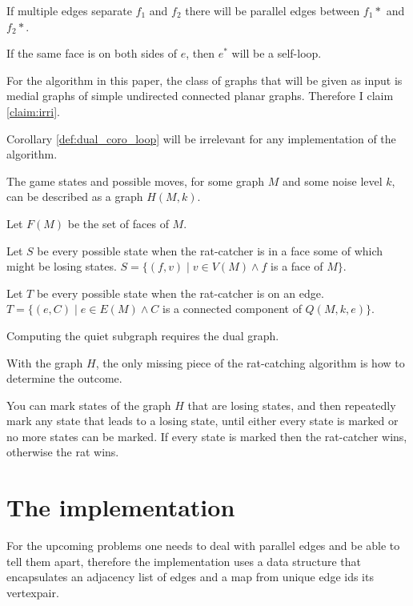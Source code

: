 \documentclass{article}
\begin{document}
	\begin{corollary}
		If multiple edges separate $f_1$ and $f_2$ there will be parallel edges between $f_1*$ and $f_2*$.
	\end{corollary}
	
	\begin{corollary}\label{def:dual_coro_loop}
		If the same face is on both sides of $e$, then $e^*$ will be a self-loop.
	\end{corollary}

	For the algorithm in this paper, the class of graphs that will be given as input is medial graphs of simple undirected connected planar graphs. Therefore I claim \ref{claim:irri}.

	\begin{claim}\label{claim:irri}
		Corollary \ref{def:dual_coro_loop} will be irrelevant for any implementation of the algorithm.
	\end{claim}

	The game states and possible moves, for some graph $M$ and some noise level $k$, can be described as a graph $H(M, k)$.

	Let $F(M)$ be the set of faces of $M$.

	Let $S$ be every possible state when the rat-catcher is in a face some of which might be losing states. $S = \{ (f, v) \mid v \in V(M) \land f$ is a face of $ M \}$.

	Let $T$ be every possible state when the rat-catcher is on an edge. $T = \{ (e, C) \mid e \in E(M) \land C$ is a connected component of $Q(M, k, e) \}$.

	Computing the quiet subgraph requires the dual graph. 
	
	With the graph $H$, the only missing piece of the rat-catching algorithm is how to determine the outcome.

	You can mark states of the graph $H$ that are losing states, and then repeatedly mark any state that leads to a losing state, until either every state is marked or no more states can be marked. If every state is marked then the rat-catcher wins, otherwise the rat wins.

\section{The implementation}

	For the upcoming problems one needs to deal with parallel edges and be able to tell them apart, therefore the implementation uses a data structure that encapsulates an adjacency list of edges and a map from unique edge ids its vertexpair.
\end{document}
